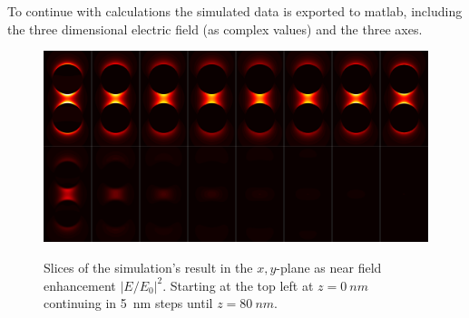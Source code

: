 To continue with calculations the simulated data is exported to matlab, including the three dimensional electric field (as complex values) and the three axes.

\begin{figure}[!h]
  \includegraphics[width=\textwidth]{./images/simulation-slices.png}
  \label{fig:slices}
  \caption{Slices of the simulation's result in the $x,y$-plane as near field enhancement $|E/E_0|^2$. Starting at the top left at $z=\SI{0}{nm}$ continuing in \SI{5}{nm} steps until $z=\SI{80}{nm}$.}
\end{figure}
